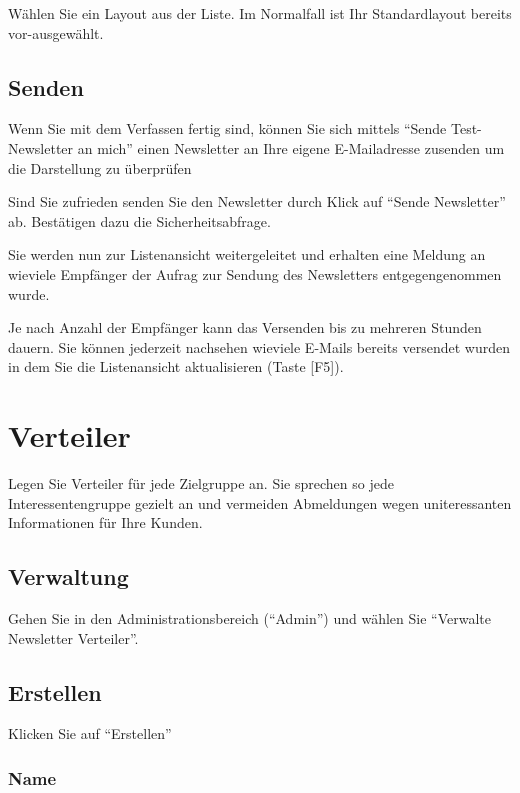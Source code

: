 \documentclass[article, a4paper, oneside, 11pt]{memoir}
\begin{document}
Wählen Sie ein Layout aus der Liste. Im Normalfall ist Ihr Standardlayout bereits vor-ausgewählt.

\section{Senden}

Wenn Sie mit dem Verfassen fertig sind, können Sie sich mittels "`Sende Test-Newsletter an mich"' einen Newsletter an Ihre eigene E-Mailadresse zusenden um die Darstellung zu überprüfen

Sind Sie zufrieden senden Sie den Newsletter durch Klick auf "`Sende Newsletter"' ab. Bestätigen dazu die Sicherheitsabfrage.

Sie werden nun zur Listenansicht weitergeleitet und erhalten eine Meldung an wieviele Empfänger der Aufrag zur Sendung des Newsletters entgegengenommen wurde.

Je nach Anzahl der Empfänger kann das Versenden bis zu mehreren Stunden dauern. Sie können jederzeit nachsehen wieviele E-Mails bereits versendet wurden in dem Sie die Listenansicht aktualisieren (Taste [F5]).



\chapter{Verteiler}
\label{sec:verteiler}

Legen Sie Verteiler für jede Zielgruppe an. Sie sprechen so jede Interessentengruppe gezielt an und vermeiden Abmeldungen wegen uniteressanten Informationen für Ihre Kunden.

\section{Verwaltung}

Gehen Sie in den Administrationsbereich ("`Admin"') und wählen Sie "`Verwalte Newsletter Verteiler"'.

\section{Erstellen}
\label{sec:create-mailing-list}

Klicken Sie auf "`Erstellen"'

\subsection{Name}
\end{document}
